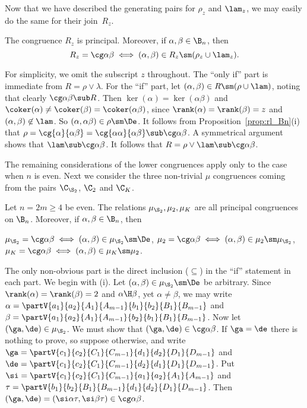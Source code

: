 Now that we have described the generating pairs for $\rho_z$ and $\lam_z$, we may easily do the same for their join~$R_z$.


\begin{prop}\label{prop:R01_Bn}
The congruence $R_z$ is principal.  Moreover, if $\alpha,\beta\in\B_n$, then
\[
R_z=\cg\alpha\beta\iff(\alpha,\beta)\in R_z\sm(\rho_z\cup\lam_z).
\]
\end{prop}

\pf
For simplicity, we omit the subscript $z$ throughout.
The ``only if'' part is immediate from $R=\rho\vee\lambda$.
For the ``if'' part, let  $(\alpha,\beta)\in R\sm(\rho\cup\lam)$, noting that clearly $\cg\alpha\beta\sub R$.  
%
Then $\ker(\alpha)=\ker(\alpha\beta)$ and $\coker(\alpha)\not=\coker(\beta)=\coker(\alpha\beta)$, since $\rank(\alpha)=\rank(\beta)=z$ and $(\alpha,\beta)\not\in \lam$.  So $(\alpha,\alpha\beta)\in\rho\sm\De$.  It follows from Proposition~\ref{prop:rl_Bn}(i) that $\rho=\cg{\alpha}{\alpha\beta}=\cg{\alpha\alpha}{\alpha\beta}\sub\cg\alpha\beta$.  A symmetrical argument shows that $\lam\sub\cg\alpha\beta$.  It follows that $R=\rho\vee\lam\sub\cg\alpha\beta$. \epf


The remaining considerations of the lower congruences apply only to the case when $n$ is even.  Next we consider the three non-trivial $\mu$ congruences coming from the pairs $\C_{\S_2}$, $\C_2$ and $\C_K$.


\newpage

\begin{prop}\label{prop:nek}
Let $n=2m\geq4$ be even.  The relations $\mu_{\S_2},\mu_2,\mu_K$ are all principal congruences on $\B_n$.  Moreover, if $\alpha,\beta\in\B_n$, then
\begin{itemize}\begin{multicols}{2}
 $\mu_{\S_2}=\cg\alpha\beta\iff (\alpha,\beta)\in\mu_{\S_2}\sm\De$,
 $\mu_2=\cg\alpha\beta\iff (\alpha,\beta)\in\mu_2\sm\mu_{\S_2}$, 
 $\mu_K=\cg\alpha\beta\iff (\alpha,\beta)\in\mu_K\sm\mu_2$.
\end{multicols}\end{itemize}
\end{prop}


\pf 
The only non-obvious part is the direct inclusion ($\subseteq$) in the ``if'' statement in each part.
%
We begin with (i).
Let $(\alpha,\beta)\in\mu_{\S_2}\sm\De$ be arbitrary.
Since $\rank(\alpha)=\rank(\beta)=2$ and $\alpha\H\beta$, yet $\alpha\not=\beta$, we may write
%
$\alpha = \partV {a_1}{a_2}{A_1}{A_{m-1}}{b_1}{b_2}{B_1}{B_{m-1}}$ and $\beta = \partV {a_1}{a_2}{A_1}{A_{m-1}}{b_2}{b_1}{B_1}{B_{m-1}}$.
%
Now let $(\ga,\de)\in\mu_{\S_2}$.  We must show that $(\ga,\de)\in\cg\alpha\beta$.
%
If $\ga=\de$ there is nothing to prove, so suppose otherwise, and write
%
$\ga = \partV {c_1}{c_2}{C_1}{C_{m-1}}{d_1}{d_2}{D_1}{D_{m-1}}$ and $\de = \partV {c_1}{c_2}{C_1}{C_{m-1}}{d_2}{d_1}{D_1}{D_{m-1}}$.
%
Put
%
$\si = \partV{c_1}{c_2}{C_1}{C_{m-1}}{a_1}{a_2}{A_1}{A_{m-1}}$ and $\tau = \partV{b_1}{b_2}{B_1}{B_{m-1}}{d_1}{d_2}{D_1}{D_{m-1}}$.
%
Then $(\ga,\de)=(\si\alpha\tau,\si\beta\tau)\in\cg\alpha\beta$.

